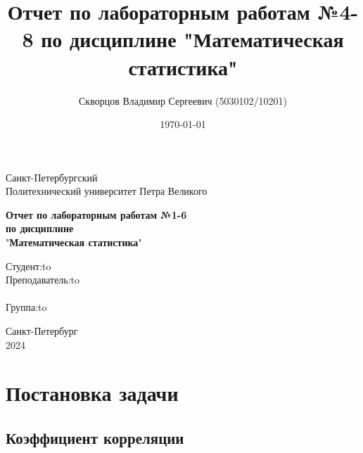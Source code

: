 \documentclass[12pt,a4paper]{article}
\title{Отчет по лабораторным работам №4-8 по дисциплине
	"Математическая статистика"}
\author{Скворцов Владимир Сергеевич (5030102/10201)}
\date{\today}
\begin{document}
	\begin{titlepage}

		\Large

		\begin{center}
			Санкт-Петербургский \\ Политехнический университет Петра Великого

			\vspace{10em}

			\textbf{Отчет по лабораторным работам №1-6} \\
			\textbf{по дисциплине}\\
			"\textbf{Математическая статистика}"

			\vspace{2em}

		\end{center}

		\vspace{6em}

		\newbox{\lbox}
		\newlength{\maxl}
		\setlength{\maxl}{\wd\lbox}
		\hfill\parbox{12cm}{
			\hspace*{3cm}\hspace*{-5cm}Студент:\hfill\hbox to\\
			\hspace*{3cm}\hspace*{-5cm}Преподаватель:\hfill\hbox to\\
			\\
			\hspace*{3cm}\hspace*{-5cm}Группа:\hfill\hbox to\\
		}

		\vspace{\fill}

		\begin{center}
			Санкт-Петербург \\ 2024
		\end{center}

	\end{titlepage}

	\tableofcontents

	\newpage

	\section{Постановка задачи}

	\subsection{Коэффициент корреляции}
\end{document}
